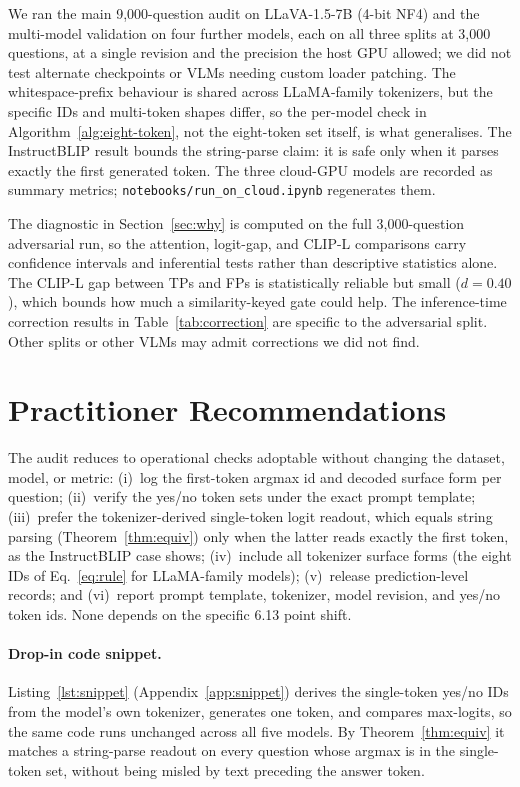 \documentclass{article}
\begin{document}
We ran the main 9{,}000-question audit on LLaVA-1.5-7B (4-bit NF4) and
the multi-model validation on four further models, each on all three
splits at 3{,}000 questions, at a single revision and the precision the
host GPU allowed; we did not test alternate checkpoints or VLMs needing
custom loader patching. The whitespace-prefix behaviour is shared across
LLaMA-family tokenizers, but the specific IDs and multi-token shapes
differ, so the per-model check in Algorithm~\ref{alg:eight-token}, not
the eight-token set itself, is what generalises. The InstructBLIP result
bounds the string-parse claim: it is safe only when it parses exactly
the first generated token. The three cloud-GPU models are recorded as
summary metrics; \texttt{notebooks/run\_on\_cloud.ipynb} regenerates
them.

The diagnostic in Section~\ref{sec:why} is computed on the full
3,000-question adversarial run, so the attention, logit-gap, and CLIP-L
comparisons carry confidence intervals and inferential tests rather
than descriptive statistics alone. The CLIP-L gap between TPs and FPs
is statistically reliable but small ($d=0.40$), which bounds how much a
similarity-keyed gate could help. The inference-time
correction results in Table~\ref{tab:correction} are specific to the
adversarial split. Other splits or other VLMs may admit corrections we
did not find.

\section{Practitioner Recommendations}
\label{sec:recs}

The audit reduces to operational checks adoptable without changing the
dataset, model, or metric: (i)~log the first-token argmax id and decoded
surface form per question; (ii)~verify the yes/no token sets under the
exact prompt template; (iii)~prefer the tokenizer-derived single-token
logit readout, which equals string parsing (Theorem~\ref{thm:equiv})
only when the latter reads exactly the first token, as the InstructBLIP
case shows; (iv)~include all tokenizer surface forms (the eight IDs of
Eq.~\ref{eq:rule} for LLaMA-family models); (v)~release prediction-level
records; and (vi)~report prompt template, tokenizer, model revision, and
yes/no token ids. None depends on the specific 6.13 point shift.

\paragraph{Drop-in code snippet.} Listing~\ref{lst:snippet}
(Appendix~\ref{app:snippet}) derives the single-token yes/no IDs from the
model's own tokenizer, generates one token, and compares max-logits, so
the same code runs unchanged across all five models. By
Theorem~\ref{thm:equiv} it matches a string-parse readout on every
question whose argmax is in the single-token set, without being misled
by text preceding the answer token.
\end{document}
